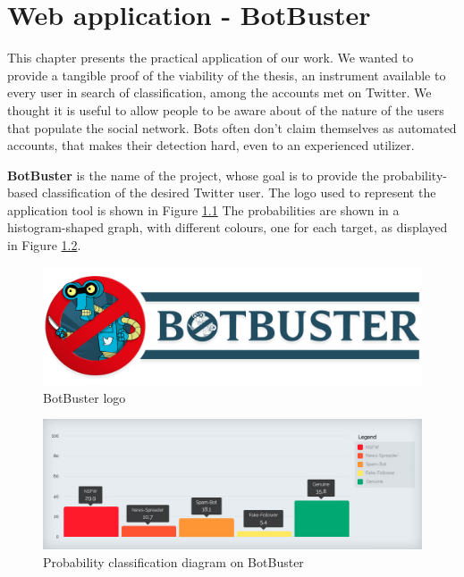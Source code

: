 \chapter{Web application - BotBuster}
\label{capitolo7}
\thispagestyle{empty}
This chapter presents the practical application of our work. We wanted to provide a tangible proof of the viability of the thesis, an instrument available to every user in search of classification, among the accounts met on Twitter.
We thought it is useful to allow people to be aware about of the nature of the users that populate the social network.
Bots often don't claim themselves as automated accounts, that makes their detection hard, even to an experienced utilizer.


\textbf{BotBuster} is the name of the project, whose goal is to provide the probability-based classification of the desired Twitter user.
The logo used to represent the application tool is shown in Figure \ref{fig:botbuster}
The probabilities are shown in a histogram-shaped graph, with different colours, one for each target, as displayed in Figure \ref{fig:histogram}.

\begin{figure}
	\begin{center}
		\includegraphics[width=\columnwidth]{chapter7/figure/logo.png}\par 
	\end{center}
	\caption{BotBuster logo}
	\label{fig:botbuster}
\end{figure}


\begin{figure}
	\begin{center}
		\includegraphics[width=\columnwidth]{chapter7/figure/histogram.jpg}\par 
	\end{center}
	\caption{Probability classification diagram on BotBuster}
	\label{fig:histogram}
\end{figure}


